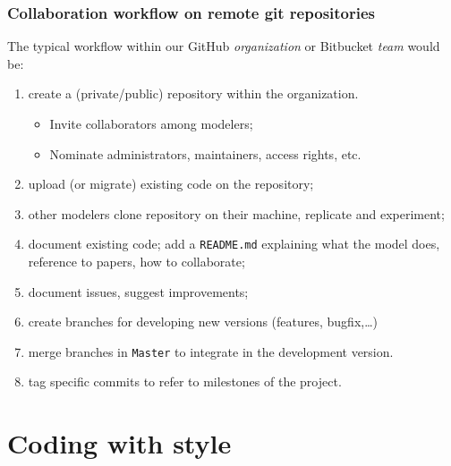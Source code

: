 \documentclass[10pt,svgnames]{beamer}
\begin{document}
\begin{frame}
\frametitle{Collaboration workflow on remote git repositories}
The typical workflow within our GitHub \emph{organization} or Bitbucket \emph{team} would be:
\begin{enumerate}[<+->]
  \item create a (private/public) repository within the organization.
  \begin{itemize}
    \item Invite collaborators among modelers;
    \item Nominate administrators, maintainers, access rights, etc.
  \end{itemize}
  \item upload (or migrate) existing code on the repository;
  \item other modelers clone repository on their machine, replicate and experiment;
  \item document existing code; add a \texttt{README.md} explaining what the model does, reference to papers, how to collaborate;
  \item document issues, suggest improvements;
  \item create branches for developing new versions (features, bugfix,\ldots)
  \item merge branches in \texttt{Master} to integrate in the development version.
  \item tag specific commits to refer to milestones of the project.
\end{enumerate}

\end{frame}



\section{Coding with style}
\end{document}
